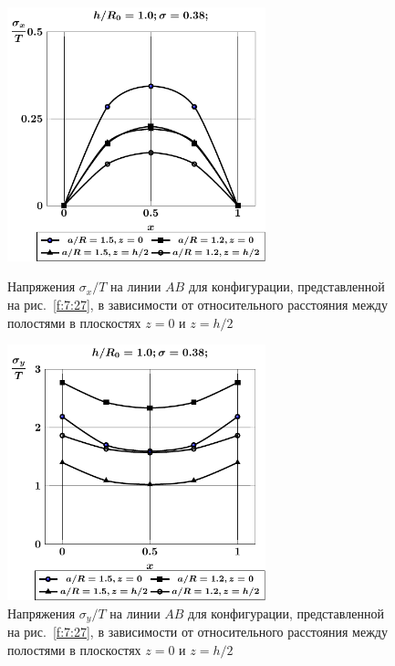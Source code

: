\begin{figure}[h!]
\centering\footnotesize
\parbox[b]{7.5cm}{\centering\includegraphics[width=7.5cm]{cav16-sig_x.pdf}
\caption{Напряжения $\sigma_x/T$ на линии $AB$ для конфигурации, представленной на рис.~\ref{f:7:27}, в зависимости от относительного расстояния между полостями в плоскостях $z=0$ и $z=h/2$
\label{f:7:28}}}\hfil\hfil
\parbox[b]{7.5cm}{\centering\includegraphics[width=7.5cm]{cav16-sig_y.pdf}
\caption{Напряжения $\sigma_y/T$ на линии $AB$ для конфигурации, представленной на рис.~\ref{f:7:27}, в зависимости от относительного расстояния между полостями в плоскостях $z=0$ и $z=h/2$
\label{f:7:29}}}
\end{figure}

